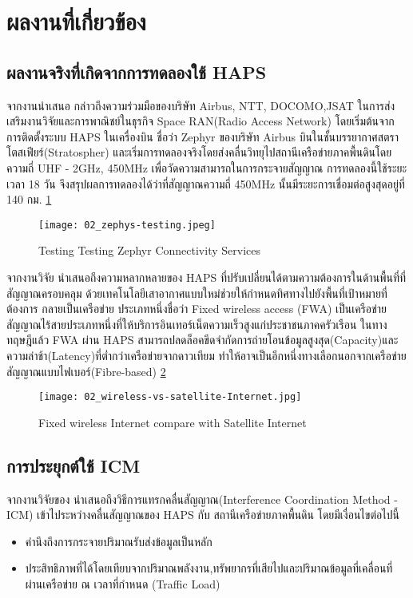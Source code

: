 \section{ผลงานที่เกี่ยวข้อง}

\subsection{ผลงานจริงที่เกิดจากการทดลองใช้ HAPS}

จากงานนำเสนอ \cite{spacecompass}
กล่าวถึงความร่วมมือของบริษัท Airbus, NTT, DOCOMO,JSAT ในการส่งเสริมงานวิจัยและการพาณิชย์ในธุรกิจ Space RAN(Radio Access Network)
โดยเริ่มต้นจากการติดตั้งระบบ HAPS ในเครื่องบิน ชื่อว่า Zephyr ของบริษัท Airbus บินในชั้นบรรยากาศสตราโตสเฟียร์(Stratospher) 
และเริ่มการทดลองจริงโดยส่งคลื่นวิทยุไปสถานีเครือข่ายภาคพื้นดินโดยความถี่
UHF - 2GHz, 450MHz เพื่อวัดความสามารถในการกระจายสัญญาณ การทดลองนี้ใช้ระยะเวลา 18 วัน 
จึงสรุปผลการทดลองได้ว่าที่สัญญาณความถี่ 450MHz นั้นมีระยะการเชื่อมต่อสูงสุดอยู่ที่ 140 กม. \ref{fig:02-zephyr-testing}

\begin{figure}[h]
\centering
\texttt{[image: 02\_zephys-testing.jpeg]}
\caption[Testing Zephyr]{Testing Testing Zephyr Connectivity Services} \label{fig:02-zephyr-testing}
\end{figure}

จากงานวิจัย \cite[Towers]{High Altitude Platform Systems: Towers in the Skies}
นำเสนอถึงความหลากหลายของ HAPS ที่ปรับเปลี่ยนได้ตามความต้องการในด้านพื้นที่ที่สัญญาณครอบคลุม ด้วยเทคโนโลยีเสาอากาศแบบใหม่ช่วยให้กำหนดทิศทางไปยังพื้นที่เป้าหมายที่ต้องการ กลายเป็นเครือข่าย
ประเภทหนึ่งชื่อว่า Fixed wireless access (FWA) เป็นเครือข่ายสัญญาณไร้สายประเภทหนึ่งที่ให้บริการอินเทอร์เน็ตความเร็วสูงแก่ประชาชนภาคครัวเรือน ในทางทฤษฎีแล้ว
FWA ผ่าน HAPS สามารถปลดล็อคขีดจำกัดการถ่ายโอนข้อมูลสูงสุด(Capacity)และความล่าช้า(Latency)ที่ต่ำกว่าเครือข่ายจากดาวเทียม
ทำให้อาจเป็นอีกหนึ่งทางเลือกนอกจากเครือข่ายสัญญาณแบบไฟเบอร์(Fibre-based) \ref{fig:02-wireless-vs-satellite}

\begin{figure}[h]
\centering
\texttt{[image: 02\_wireless-vs-satellite-Internet.jpg]}
\caption[wireless vs satellite]{Fixed wireless Internet compare with Satellite Internet} \label{fig:02-wireless-vs-satellite}
\end{figure}

\subsection{การประยุกต์ใช้ ICM}

จากงานวิจัยของ \cite{liu2021interference}
นำเสนอถึงวิธีการแทรกคลื่นสัญญาณ(Interference Coordination Method - ICM) เข้าไประหว่างคลื่นสัญญาณของ HAPS กับ สถานีเครือข่ายภาคพื้นดิน โดยมีเงื่อนไขต่อไปนี้
\begin{itemize}
    \item คำนึงถึงการกระจายปริมาณรับส่งข้อมูลเป็นหลัก 
    \item ประสิทธิภาพที่ได้โดยเทียบจากปริมาณพลังงาน,ทรัพยากรที่เสียไปและปริมาณข้อมูลที่เคลื่อนที่ผ่านเครือข่าย ณ เวลาที่กำหนด (Traffic Load)
\end{itemize}
